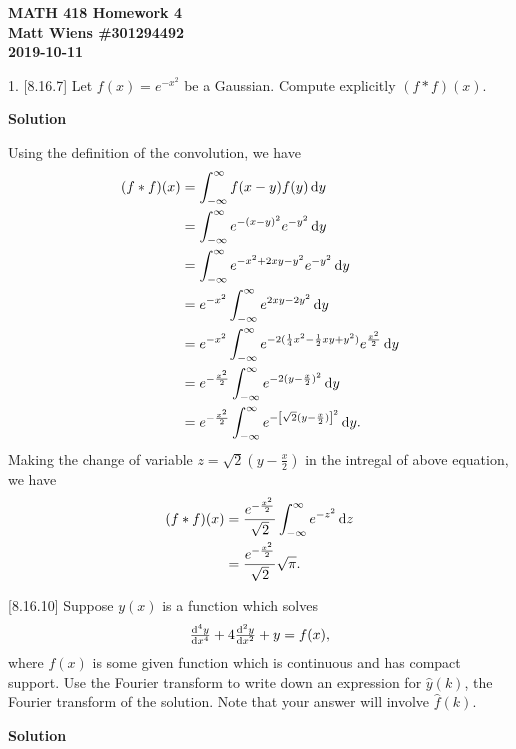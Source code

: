 \documentclass{article}
\begin{document}
\textbf{MATH 418 Homework 4} \\
\textbf{Matt Wiens \#301294492} \\
\textbf{2019-10-11}

1. [8.16.7] Let $f(x) = e^{-x^2}$ be a Gaussian. Compute explicitly $(f * f)(x)$.

\textbf{Solution}

Using the definition of the convolution, we have
%
\begin{align*}
    (f * f)(x)
        &= \int_{- \infty}^{\infty} f(x - y) f(y) \dif y \\
        &= \int_{- \infty}^{\infty} e^{-(x - y)^2} e^{-y^2} \dif y \\
        &= \int_{- \infty}^{\infty} e^{-x^2 + 2 x y - y^2} e^{-y^2} \dif y \\
        &= e^{-x^2} \int_{- \infty}^{\infty} e^{2 x y - 2 y^2} \dif y \\
        &= e^{-x^2} \int_{- \infty}^{\infty} e^{-2 (\frac{1}{4} x^2 - \frac{1}{2} x y + y^2)} e^{\frac{x^2}{2}} \dif y \\
        &= e^{- \frac{x^2}{2}} \int_{- \infty}^{\infty} e^{-2 (y - \frac{x}{2})^2} \dif y \\
        &= e^{- \frac{x^2}{2}} \int_{- \infty}^{\infty} e^{- \sbr{\sqrt2 (y - \frac{x}{2})}^2} \dif y
        .
\end{align*}
%
Making the change of variable $z = \sqrt2 (y - \frac{x}{2})$ in the
intregal of above equation, we have
%
\begin{align*}
    (f * f)(x)
        &= \frac{e^{- \frac{x^2}{2}}}{\sqrt{2}} \int_{- \infty}^{\infty} e^{- z^2} \dif z \\
        &= \frac{e^{- \frac{x^2}{2}}}{\sqrt{2}} \sqrt{\pi}
        .
\end{align*}

\vspace{5mm}

[8.16.10] Suppose $y(x)$ is a function which solves
%
\begin{equation*}
    \od[4]{y}{x} + 4 \od[2]{y}{x} + y = f(x)
    ,
\end{equation*}
%
where $f(x)$ is some given function which is continuous and has compact
support. Use the Fourier transform to write down an expression for
$\widehat{y}(k)$, the Fourier transform of the solution. Note that your
answer will involve $\widehat{f}(k)$.

\textbf{Solution}
\end{document}
